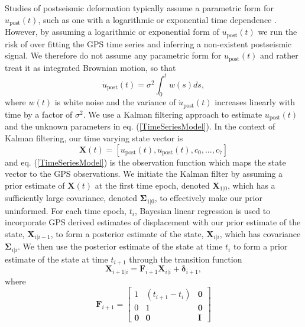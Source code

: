 Studies of postseismic deformation typically assume a parametric form
for $u_\mathrm{post}(t)$, such as one with a logarithmic or
exponential time dependence \citep[e.g.,][]{Savage2005a}.  However, by
assuming a logarithmic or exponential form of $u_\mathrm{post}(t)$ we
run the risk of over fitting the GPS time series and inferring a
non-existent postseismic signal. We therefore do not assume any
parametric form for $u_\mathrm{post}(t)$ and rather treat it as
integrated Brownian motion, so that
\begin{equation}
    \dot{u}_\mathrm{post}(t) = \sigma^2\int_0^t w(s) ds,
\end{equation}    
where $w(t)$ is white noise and the variance of
$\dot{u}_\mathrm{post}(t)$ increases linearly with time by a factor of
$\sigma^2$. We use a Kalman filtering approach to estimate
$u_\mathrm{post}(t)$ and the unknown parameters in eq.
(\ref{TimeSeriesModel}).  In the context of Kalman filtering, our time
varying state vector is
\begin{equation}
    \mathbf{X}(t) = [u_\mathrm{post}(t),\dot u_\mathrm{post}(t), c_0, ..., c_7]
\end{equation}
and eq. (\ref{TimeSeriesModel}) is the observation function which maps
the state vector to the GPS observations. We initiate the Kalman
filter by assuming a prior estimate of $\mathbf{X}(t)$ at the first
time epoch, denoted $\mathbf{X}_{1|0}$, which has a sufficiently large
covariance, denoted $\mathbf{\Sigma}_{1|0}$, to effectively make our
prior uninformed.  For each time epoch, $t_i$, Bayesian linear
regression is used to incorporate GPS derived estimates of
displacement with our prior estimate of the state,
$\mathbf{X}_{i|i-1}$, to form a posterior estimate of the state,
$\mathbf{X}_{i|i}$, which has covariance $\mathbf{\Sigma}_{i|i}$.  We
then use the posterior estimate of the state at time $t_i$ to form a
prior estimate of the state at time $t_{i+1}$ through the transition
function
\begin{equation}\label{predict}
  \mathbf{X}_{i+1|i} = \mathbf{F}_{i+1}\mathbf{X}_{i|i} + \mathbf{\delta}_{i+1}, 
\end{equation}
where 
\begin{equation}
  \mathbf{F}_{i+1} = 
  \left[
  \begin{array}{ccc}
    1           & (t_{i+1} - t_i) & \mathbf{0}\\
    0           & 1              & \mathbf{0}\\
    \mathbf{0}  & \mathbf{0}     & \mathbf{I}
  \end{array}
  \right]
\end{equation}
